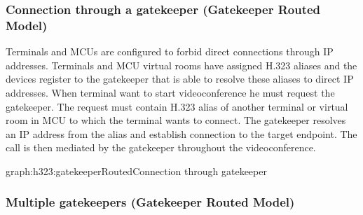 \documentclass[a4paper]{report}
\begin{document}
\subsubsection{Connection through a gatekeeper (Gatekeeper Routed Model)}

Terminals and MCUs are configured to forbid direct connections through IP addresses. Terminals and MCU virtual rooms have assigned H.323 aliases and the devices register to the gatekeeper that is able to resolve these aliases to direct IP addresses. When terminal want to start videoconference he must request the gatekeeper. The request must contain H.323 alias of another terminal or virtual room in MCU to which the terminal wants to connect. The gatekeeper resolves an IP address from the alias and establish connection to the target endpoint. The call is then mediated by the gatekeeper throughout the videoconference.

\begin{Graph}{graph:h323:gatekeeperRouted}{Connection through gatekeeper}{}
  
  
\end{Graph}

\subsubsection{Multiple gatekeepers (Gatekeeper Routed Model)}
\end{document}
